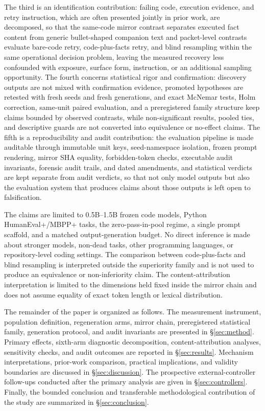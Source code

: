 \documentclass{article}
\numberwithin{equation}{section}  %
\theoremstyle{definition}
\begin{document}
The third is an identification contribution: failing code, execution evidence, and retry instruction,
which are often presented jointly in prior work, are decomposed, so that the same-code mirror contrast
separates executed fact content from generic bullet-shaped companion text and packet-level contrasts
evaluate bare-code retry, code-plus-facts retry, and blind resampling within the same operational
decision problem, leaving the measured recovery less confounded with exposure, surface form,
instruction, or an additional sampling opportunity. The fourth concerns statistical rigor and
confirmation: discovery outputs are not mixed with confirmation evidence, promoted hypotheses are
retested with fresh seeds and fresh generations, and exact McNemar tests, Holm correction, same-unit
paired evaluation, and a preregistered family structure keep claims bounded by observed contrasts,
while non-significant results, pooled ties, and descriptive guards are not converted into equivalence
or no-effect claims. The fifth is a reproducibility and audit contribution: the evaluation pipeline is
made auditable through immutable unit keys, seed-namespace isolation, frozen prompt rendering, mirror
SHA equality, forbidden-token checks, executable audit invariants, forensic audit trails, and dated
amendments, and statistical verdicts are kept separate from audit verdicts, so that not only model
outputs but also the evaluation system that produces claims about those outputs is left open to
falsification.

The claims are limited to 0.5B--1.5B frozen code models, Python HumanEval+/MBPP+ tasks, the
zero-pass-in-pool regime, a single prompt scaffold, and a matched output-generation budget. No direct
inference is made about stronger models, non-dead tasks, other programming languages, or
repository-level coding settings. The comparison between code-plus-facts and blind resampling is
interpreted outside the superiority family and is not used to produce an equivalence or
non-inferiority claim. The content-attribution interpretation is limited to the dimensions held fixed
inside the mirror chain and does not assume equality of exact token length or lexical distribution.

The remainder of the paper is organized as follows. The measurement instrument, population definition,
regeneration arms, mirror chain, preregistered statistical family, generation protocol, and audit
invariants are presented in \S\ref{sec:method}. Primary effects, sixth-arm diagnostic decomposition,
content-attribution analyses, sensitivity checks, and audit outcomes are reported in
\S\ref{sec:results}. Mechanism interpretations, prior-work comparison, practical implications, and
validity boundaries are discussed in \S\ref{sec:discussion}. The prospective external-controller
follow-ups conducted after the primary analysis are given in \S\ref{sec:controllers}. Finally, the
bounded conclusion and transferable methodological contribution of the study are summarized in
\S\ref{sec:conclusion}.
\end{document}
